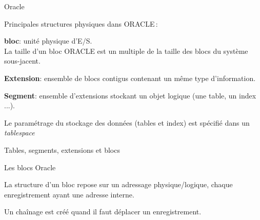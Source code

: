 
\begin{frame}
{Oracle}

Principales structures physiques dans ORACLE\,:
\begin{redbullet}
  \item  {\bf bloc}: unité physique d'E/S.\\
     La taille d'un bloc ORACLE est un
        multiple de la taille des blocs du système sous-jacent.

  \item {\bf Extension}:  ensemble de blocs contigus contenant
        un m\^eme type d'information.

  \item  {\bf Segment}: ensemble d'extensions stockant un 
        objet logique (une table, un index ...). 
\end{redbullet}

Le paramétrage du stockage des données (tables et index)
est spécifié dans un {\it tablespace}

\end{frame}


\begin{frame}{Tables, segments, extensions et blocs}


\end{frame}

\begin{frame}{Les blocs Oracle}

La structure d'un bloc repose sur
un adressage physique/logique, chaque enregistrement
ayant une adresse interne.

\vfill
 

\vfill

Un chaînage est créé quand il faut déplacer un enregistrement.

\end{frame}

